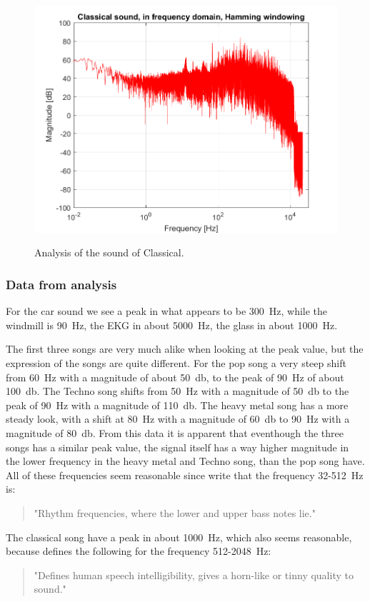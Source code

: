 \begin{figure}[htb!]
	{\includegraphics[width=0.45\linewidth]{code/Classical_figure5.png}}
	\caption{Analysis of the sound of Classical.}\label{fig:klassisk}
\end{figure}

\subsubsection{Data from analysis}

For the car sound we see a peak in what appears to be \SI{300}{\hertz}, while the windmill is \SI{90}{\hertz}, the EKG in about \SI{5000}{\hertz}, the glass in about \SI{1000}{\hertz}. 

The first three songs are very much alike when looking at the peak value, but the expression of the songs are quite different. For the pop song a very steep shift from \SI{60}{\hertz} with a magnitude of about \SI{50}{\decibel}, to the peak of \SI{90}{\hertz} of about \SI{100}{\decibel}. The Techno song shifts from \SI{50}{\hertz} with a magnitude of \SI{50}{\decibel} to the peak of \SI{90}{\hertz} with a magnitude of \SI{110}{\decibel}. The heavy metal song has a more steady look, with a shift at \SI{80}{\hertz} with a magnitude of \SI{60}{\decibel} to \SI{90}{\hertz} with a magnitude of \SI{80}{\decibel}. From this data it is apparent that eventhough the three songs has a similar peak value, the signal itself has a way higher magnitude in the lower frequency in the heavy metal and Techno song, than the pop song have. All of these frequencies seem reasonable since \cite{FREQ} write that the frequency 32-\SI{512}{\hertz} is:
\begin{quotation}
"Rhythm frequencies, where the lower and upper bass notes lie."
\end{quotation}

The classical song have a peak in about \SI{1000}{\hertz}, which also seems reasonable, because \cite{FREQ} defines the following for the frequency 512-\SI{2048}{\hertz}:

\begin{quotation}
"Defines human speech intelligibility, gives a horn-like or tinny quality to sound."
\end{quotation}


